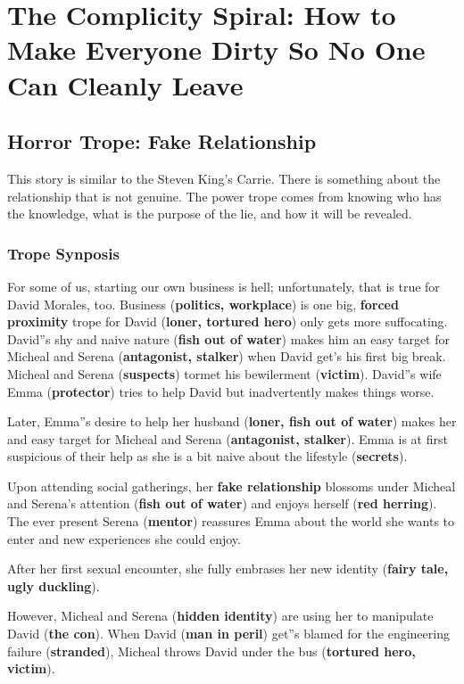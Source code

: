 \section{The Complicity Spiral: How to Make Everyone Dirty So No One Can Cleanly Leave}

\subsection{Horror Trope: Fake Relationship}

This story is similar to the Steven King's Carrie. There is something about the 
relationship that is not genuine. The power trope comes from knowing who has the
knowledge, what is the purpose of the lie, and how it will be revealed.


\subsubsection{Trope Synposis}

For some of us, starting our own business is hell; unfortunately, that is true for
David Morales, too. Business (\textbf{politics, workplace}) is one big, \textbf{forced proximity}
trope for David (\textbf{loner, tortured hero}) only gets more suffocating. David''s
shy and naive nature (\textbf{fish out of water}) makes him an easy target for 
Micheal and Serena (\textbf{antagonist, stalker}) when David get's his first big break.
Micheal and Serena (\textbf{suspects}) tormet his bewilerment (\textbf{victim}). 
David''s wife Emma (\textbf{protector}) tries to help David but inadvertently makes 
things worse.

Later, Emma''s desire to help her husband (\textbf{loner, fish out of water}) makes
her and easy target for Micheal and Serena (\textbf{antagonist, stalker}). Emma is 
at first suspicious of their help as she is a bit naive about the lifestyle 
(\textbf{secrets}).

Upon attending social gatherings, her \textbf{fake relationship} blossoms under 
Micheal and Serena's attention (\textbf{fish out of water}) and enjoys herself
(\textbf{red herring}). The ever present Serena (\textbf{mentor}) reassures Emma
about the world she wants to enter and new experiences she could enjoy.

After her first sexual encounter, she fully embrases her new identity 
(\textbf{fairy tale, ugly duckling}).

However, Micheal and Serena (\textbf{hidden identity})
are using her to manipulate David
(\textbf{the con}). When David (\textbf{man in peril}) get''s blamed for the
engineering failure (\textbf{stranded}), Micheal throws David under the bus
(\textbf{tortured hero, victim}).

